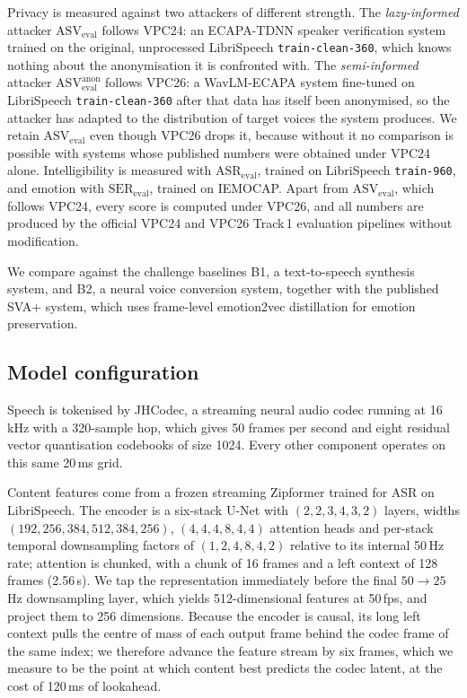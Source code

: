 \documentclass{article}
\begin{document}
Privacy is measured against two attackers of different strength.
The \emph{lazy-informed} attacker $\mathrm{ASV}_{\mathrm{eval}}$ follows VPC24: an ECAPA-TDNN speaker verification system trained on the original, unprocessed LibriSpeech \texttt{train-clean-360}, which knows nothing about the anonymisation it is confronted with.
The \emph{semi-informed} attacker $\mathrm{ASV}^{\mathrm{anon}}_{\mathrm{eval}}$ follows VPC26: a WavLM-ECAPA system fine-tuned on LibriSpeech \texttt{train-clean-360} after that data has itself been anonymised, so the attacker has adapted to the distribution of target voices the system produces.
We retain $\mathrm{ASV}_{\mathrm{eval}}$ even though VPC26 drops it, because without it no comparison is possible with systems whose published numbers were obtained under VPC24 alone.
Intelligibility is measured with $\mathrm{ASR}_{\mathrm{eval}}$, trained on LibriSpeech \texttt{train-960}, and emotion with $\mathrm{SER}_{\mathrm{eval}}$, trained on IEMOCAP.
Apart from $\mathrm{ASV}_{\mathrm{eval}}$, which follows VPC24, every score is computed under VPC26, and all numbers are produced by the official VPC24 and VPC26 Track\,1 evaluation pipelines without modification.

We compare against the challenge baselines B1, a text-to-speech synthesis system, and B2, a neural voice conversion system, together with the published SVA+ system, which uses frame-level emotion2vec distillation for emotion preservation.

\subsection{Model configuration}
\label{ssec:config}
Speech is tokenised by JHCodec, a streaming neural audio codec running at 16\,kHz with a 320-sample hop, which gives 50 frames per second and eight residual vector quantisation codebooks of size 1024.
Every other component operates on this same 20\,ms grid.

Content features come from a frozen streaming Zipformer trained for ASR on LibriSpeech.
The encoder is a six-stack U-Net with $(2,2,3,4,3,2)$ layers, widths $(192,256,384,512,384,256)$, $(4,4,4,8,4,4)$ attention heads and per-stack temporal downsampling factors of $(1,2,4,8,4,2)$ relative to its internal 50\,Hz rate; attention is chunked, with a chunk of 16 frames and a left context of 128 frames (2.56\,s).
We tap the representation immediately before the final $50 \rightarrow 25$\,Hz downsampling layer, which yields 512-dimensional features at 50\,fps, and project them to 256 dimensions.
Because the encoder is causal, its long left context pulls the centre of mass of each output frame behind the codec frame of the same index; we therefore advance the feature stream by six frames, which we measure to be the point at which content best predicts the codec latent, at the cost of 120\,ms of lookahead.
\end{document}
